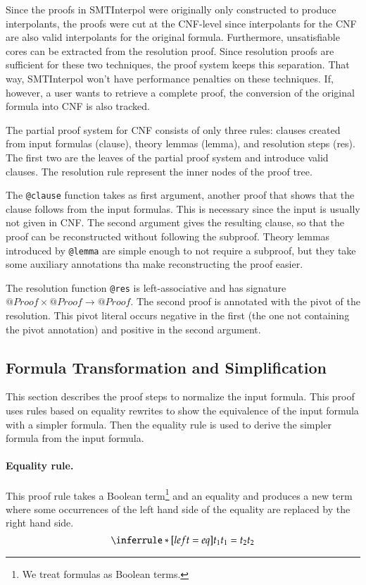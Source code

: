 \documentclass[a4paper]{article}
\newcommand\si{SMTInterpol\xspace}
\begin{document}
Since the proofs in \si were originally only constructed to produce
interpolants, the proofs were cut at the CNF-level since interpolants
for the CNF are also valid interpolants for the original formula.
Furthermore, unsatisfiable cores can be extracted from the resolution
proof.  Since resolution proofs are sufficient for these two
techniques, the proof system keeps this separation.  That way, \si
won't have performance penalties on these techniques.  If, however, a
user wants to retrieve a complete proof, the conversion of the
original formula into CNF is also tracked.

The partial proof system for CNF consists of only three rules: clauses
created from input formulas (clause), theory lemmas
(lemma), and resolution steps (res).  The first two
are the leaves of the partial proof system and introduce valid
clauses.  The resolution rule represent the inner nodes of the proof
tree.

The \verb+@clause+ function takes as first argument, another proof
that shows that the clause follows from the input formulas.  This is
necessary since the input is usually not given in CNF.  The second
argument gives the resulting clause, so that the proof can be
reconstructed without following the subproof. Theory lemmas introduced
by \verb+@lemma+ are simple enough to not require a subproof, but
they take some auxiliary annotations tha make reconstructing the proof
easier.

The resolution function \verb+@res+ is
left-associative and has signature $@Proof\times@Proof\rightarrow@Proof$.  The
second proof is annotated with the pivot of the resolution.  This pivot
literal occurs negative in the first (the one not containing the pivot
annotation) and positive in the second argument.

\subsection{Formula Transformation and Simplification}

This section describes the proof steps to normalize the input formula.
This proof uses rules based on equality rewrites to show the
equivalence of the input formula with a simpler formula.  Then the
equality rule is used to derive the simpler formula from the input
formula.

\paragraph{Equality rule.}  This proof rule takes a Boolean term\footnote{We treat
  formulas as Boolean terms.} and an equality and produces a new term
where some occurrences of the left hand side of the equality are
replaced by the right hand side.
\[
\inferrule*[left=eq]{t_1 \\ t_1=t_2}{t_2}
\]
\end{document}

